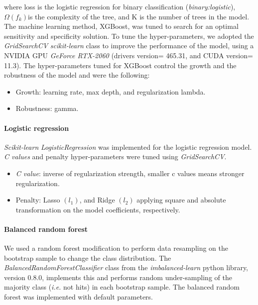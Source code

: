 where loss is the logistic regression for binary classification (\textit{binary:logistic}), $\Omega(f_k) $is the complexity of the tree, and K is the number of trees in the model. The machine learning method, XGBoost, was tuned to search for an optimal sensitivity and specificity solution. To tune the hyper-parameters, we adopted the \textit{GridSearchCV} \textit{scikit-learn}\autocite{pedregosa_2011_scikit} class to improve the performance of the model, using a NVIDIA GPU \textit{GeForce RTX-2060} (drivers version= 465.31, and CUDA version= 11.3). The hyper-parameters tuned for XGBoost control the growth and the robustness of the model and were the following:

\begin{itemize}
\item Growth: learning rate, max depth, and regularization lambda.
\item Robustness: gamma.
\end{itemize}

\paragraph{Logistic regression}
\label{sec:logit_methods}

\textit{Scikit-learn}\autocite{pedregosa_2011_scikit} \textit{LogisticRegression} was implemented for the logistic regression model. \textit{C values} and penalty hyper-parameters were tuned using \textit{GridSearchCV}.

\begin{itemize}
\item \textit{C value}: inverse of regularization strength, smaller c values means stronger regularization. 
\item Penalty: Lasso $(l_1)$, and Ridge $(l_2)$ applying square and absolute transformation on the model coefficients, respectively. 
\end{itemize}

\paragraph{Balanced random forest}
\label{sec:logit_methods}

We used a random forest modification to perform data resampling on the bootstrap sample to change the class distribution. The \textit{BalancedRandomForestClassifier} class from the \textit{imbalanced-learn}\autocite{lemaitre_2017_imbalanced} python library, version 0.8.0, implements this and performs random under-sampling of the majority class (\textit{i.e.} not hits) in each bootstrap sample. The balanced random forest was implemented with default parameters. 

